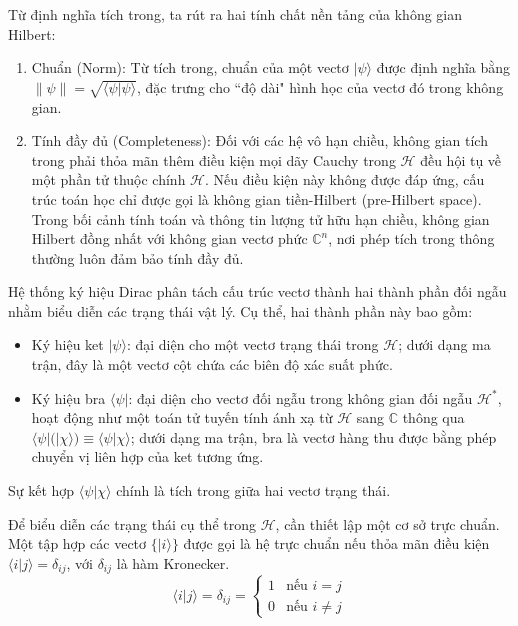 \begin{remark}  Từ định nghĩa tích trong, ta rút ra hai tính chất nền tảng của không gian Hilbert:
\begin{enumerate}
    \item Chuẩn (Norm): Từ tích trong, chuẩn của một vectơ $|\psi\rangle$ được định nghĩa bằng $\|\psi\| = \sqrt{\langle \psi | \psi \rangle}$, đặc trưng cho ``độ dài" hình học của vectơ đó trong không gian.
    
    \item Tính đầy đủ (Completeness): Đối với các hệ vô hạn chiều, không gian tích trong phải thỏa mãn thêm điều kiện mọi dãy Cauchy trong $\mathcal{H}$ đều hội tụ về một phần tử thuộc chính $\mathcal{H}$. Nếu điều kiện này không được đáp ứng, cấu trúc toán học chỉ được gọi là không gian tiền-Hilbert (pre-Hilbert space). Trong bối cảnh tính toán và thông tin lượng tử hữu hạn chiều, không gian Hilbert đồng nhất với không gian vectơ phức $\mathbb{C}^n$, nơi phép tích trong thông thường luôn đảm bảo tính đầy đủ.
\end{enumerate}
\end{remark}

\begin{convention} 
Hệ thống ký hiệu Dirac phân tách cấu trúc vectơ thành hai thành phần đối ngẫu nhằm biểu diễn các trạng thái vật lý. Cụ thể, hai thành phần này bao gồm:
\begin{itemize}
    \item Ký hiệu ket $|\psi\rangle$: đại diện cho một vectơ trạng thái trong $\mathcal{H}$; dưới dạng ma trận, đây là một vectơ cột chứa các biên độ xác suất phức.
    \item Ký hiệu bra $\langle\psi|$: đại diện cho vectơ đối ngẫu trong không gian đối ngẫu $\mathcal{H}^*$, hoạt động như một toán tử tuyến tính ánh xạ từ $\mathcal{H}$ sang $\mathbb{C}$ thông qua $\langle \psi | (|\chi\rangle) \equiv \langle \psi | \chi \rangle$; dưới dạng ma trận, bra là vectơ hàng thu được bằng phép chuyển vị liên hợp của ket tương ứng.
\end{itemize}
Sự kết hợp $\langle \psi | \chi \rangle$ chính là tích trong giữa hai vectơ trạng thái.
\end{convention}

\begin{definition} 
Để biểu diễn các trạng thái cụ thể trong $\mathcal{H}$, cần thiết lập một cơ sở trực chuẩn. Một tập hợp các vectơ $\{|i\rangle\}$ được gọi là hệ trực chuẩn nếu thỏa mãn điều kiện $\langle i|j\rangle = \delta_{ij}$, với $\delta_{ij}$ là hàm Kronecker. 
$$\langle i|j\rangle = \delta_{ij}=\begin{cases} 
1 & \text{nếu } i = j \\ 
0 & \text{nếu } i \neq j 
\end{cases}$$
\end{definition}

